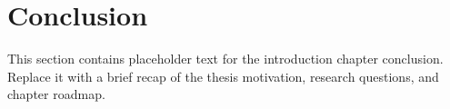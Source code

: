 \section{Conclusion}
\label{sec::Introduction::conclusion}

This section contains placeholder text for the introduction chapter conclusion. Replace it with a brief recap of the thesis motivation, research questions, and chapter roadmap.
